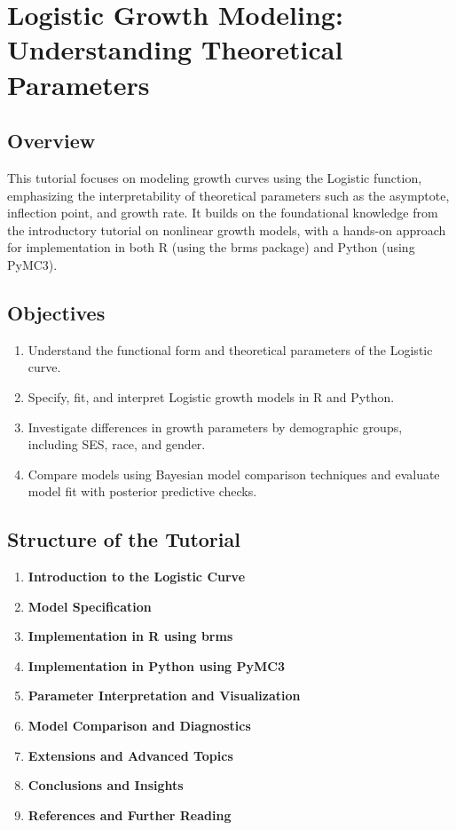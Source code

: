 \documentclass[
  letterpaper,
  DIV=11,
  numbers=noendperiod]{scrreprt}
\providecommand{\tightlist}{%
  \setlength{\itemsep}{0pt}\setlength{\parskip}{0pt}}\usepackage{longtable,booktabs,array}
\begin{document}
\chapter{Logistic Growth Modeling: Understanding Theoretical
Parameters}\label{logistic-growth-modeling-understanding-theoretical-parameters}

\section{Overview}\label{overview-1}

This tutorial focuses on modeling growth curves using the Logistic
function, emphasizing the interpretability of theoretical parameters
such as the asymptote, inflection point, and growth rate. It builds on
the foundational knowledge from the introductory tutorial on nonlinear
growth models, with a hands-on approach for implementation in both R
(using the brms package) and Python (using PyMC3).

\section{Objectives}\label{objectives-1}

\begin{enumerate}
\def\labelenumi{\arabic{enumi}.}
\tightlist
\item
  Understand the functional form and theoretical parameters of the
  Logistic curve.
\item
  Specify, fit, and interpret Logistic growth models in R and Python.
\item
  Investigate differences in growth parameters by demographic groups,
  including SES, race, and gender.
\item
  Compare models using Bayesian model comparison techniques and evaluate
  model fit with posterior predictive checks.
\end{enumerate}

\section{Structure of the Tutorial}\label{structure-of-the-tutorial}

\begin{enumerate}
\def\labelenumi{\arabic{enumi}.}
\tightlist
\item
  \textbf{Introduction to the Logistic Curve}
\item
  \textbf{Model Specification}
\item
  \textbf{Implementation in R using brms}
\item
  \textbf{Implementation in Python using PyMC3}
\item
  \textbf{Parameter Interpretation and Visualization}
\item
  \textbf{Model Comparison and Diagnostics}
\item
  \textbf{Extensions and Advanced Topics}
\item
  \textbf{Conclusions and Insights}
\item
  \textbf{References and Further Reading}
\end{enumerate}
\end{document}
